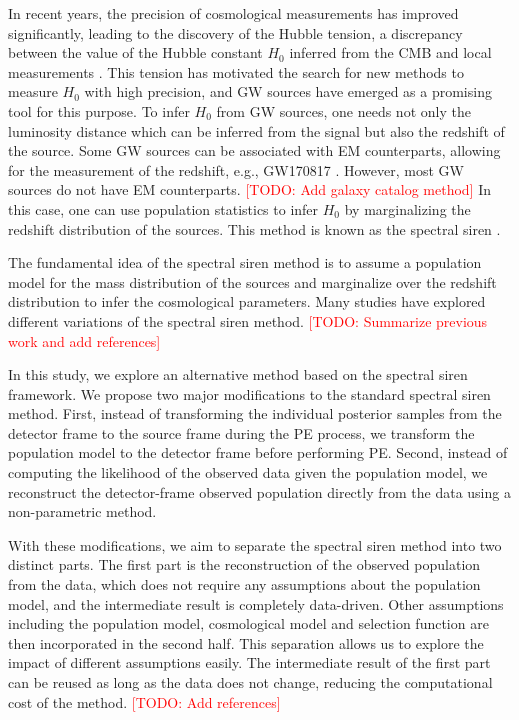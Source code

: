 \documentclass[aps,prd,twocolumn,superscriptaddress,preprintnumbers,nofootinbib,hidelinks]{revtex4-2}
\newcommand{\todo}[1]{\textcolor{red}{[TODO: #1]}}
\begin{document}
In recent years, the precision of cosmological measurements has improved significantly, leading to the discovery of the Hubble tension, a discrepancy between the value of the Hubble constant $H_0$ inferred from the \ac{CMB} \citep{Planck:2018vyg} and local measurements \citep{Riess:2021jrx}.
This tension has motivated the search for new methods to measure $H_0$ with high precision, and \ac{GW} sources have emerged as a promising tool for this purpose.
To infer $H_0$ from \ac{GW} sources, one needs not only the luminosity distance which can be inferred from the signal but also the redshift of the source.
Some \ac{GW} sources can be associated with \ac{EM} counterparts, allowing for the measurement of the redshift, e.g., GW170817 \citep{LIGOScientific:2017adf, Guidorzi:2017ogy}.
However, most \ac{GW} sources do not have \ac{EM} counterparts. \todo{Add galaxy catalog method}
In this case, one can use population statistics to infer $H_0$ by marginalizing the redshift distribution of the sources.
This method is known as the spectral siren \citep{You:2020wju, Mastrogiovanni:2021wsd, LIGOScientific:2021aug, Ezquiaga:2022zkx}.

The fundamental idea of the spectral siren method is to assume a population model for the mass distribution of the sources and marginalize over the redshift distribution to infer the cosmological parameters.
Many studies have explored different variations of the spectral siren method.
\todo{Summarize previous work and add references}

In this study, we explore an alternative method based on the spectral siren framework.
We propose two major modifications to the standard spectral siren method.
First, instead of transforming the individual posterior samples from the detector frame to the source frame during the \ac{PE} process, we transform the population model to the detector frame before performing \ac{PE}.
Second, instead of computing the likelihood of the observed data given the population model, we reconstruct the detector-frame observed population directly from the data using a non-parametric method.

With these modifications, we aim to separate the spectral siren method into two distinct parts.
The first part is the reconstruction of the observed population from the data, which does not require any assumptions about the population model, and the intermediate result is completely data-driven.
Other assumptions including the population model, cosmological model and selection function are then incorporated in the second half.
This separation allows us to explore the impact of different assumptions easily.
The intermediate result of the first part can be reused as long as the data does not change, reducing the computational cost of the method.
\todo{Add references}
\end{document}
